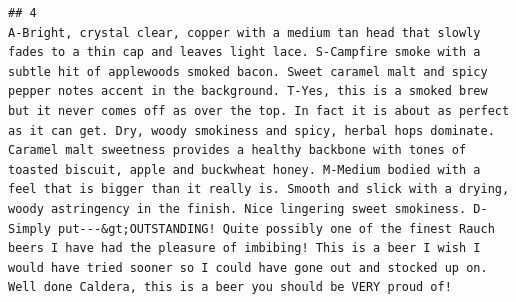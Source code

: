 \documentclass[
  a4paper,
]{article}
\begin{document}
\begin{verbatim}
## 4                                                                                                                                                                                                                                                                                                                                                                                                                                                                                                                                                                                                                                                                                                                                                                                                                                                                                                                                                                                                                                                                                                                                                                    A-Bright, crystal clear, copper with a medium tan head that slowly fades to a thin cap and leaves light lace. S-Campfire smoke with a subtle hit of applewoods smoked bacon. Sweet caramel malt and spicy pepper notes accent in the background. T-Yes, this is a smoked brew but it never comes off as over the top. In fact it is about as perfect as it can get. Dry, woody smokiness and spicy, herbal hops dominate. Caramel malt sweetness provides a healthy backbone with tones of toasted biscuit, apple and buckwheat honey. M-Medium bodied with a feel that is bigger than it really is. Smooth and slick with a drying, woody astringency in the finish. Nice lingering sweet smokiness. D-Simply put---&gt;OUTSTANDING! Quite possibly one of the finest Rauch beers I have had the pleasure of imbibing! This is a beer I wish I would have tried sooner so I could have gone out and stocked up on. Well done Caldera, this is a beer you should be VERY proud of!

\end{verbatim}
\end{document}
